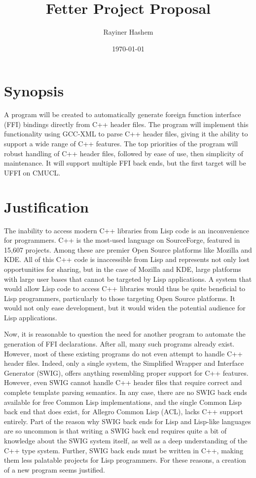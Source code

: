 \documentclass[12pt]{article}
\begin{document}
\title{Fetter Project Proposal}
\author{Rayiner Hashem}
\date{\today}
\maketitle

\section{Synopsis}

A program will be created to automatically generate foreign function
interface (FFI) bindings directly from C++ header files. The program
will implement this functionality using GCC-XML to parse C++ header
files, giving it the ability to support a wide range of C++ features.
The top priorities of the program will robust handling of C++ header
files, followed by ease of use, then simplicity of maintenance. It
will support multiple FFI back ends, but the first target will be UFFI
on CMUCL.

\section{Justification}

The inability to access modern C++ libraries from Lisp code is an
inconvenience for programmers. C++ is the most-used language on
SourceForge, featured in 15,607 projects. Among these are premier Open
Source platforms like Mozilla and KDE. All of this C++ code is
inaccessible from Lisp and represents not only lost opportunities for
sharing, but in the case of Mozilla and KDE, large platforms with
large user bases that cannot be targeted by Lisp applications. A
system that would allow Lisp code to access C++ libraries would thus
be quite beneficial to Lisp programmers, particularly to those
targeting Open Source platforms. It would not only ease development,
but it would widen the potential audience for Lisp applications.

Now, it is reasonable to question the need for another program to
automate the generation of FFI declarations. After all, many such
programs already exist. However, most of these existing programs do
not even attempt to handle C++ header files. Indeed, only a single
system, the Simplified Wrapper and Interface Generator (SWIG), offers
anything resembling proper support for C++ features. However, even
SWIG cannot handle C++ header files that require correct and complete
template parsing semantics. In any case, there are no SWIG back ends
available for free Common Lisp implementations, and the single Common
Lisp back end that does exist, for Allegro Common Lisp (ACL), lacks
C++ support entirely. Part of the reason why SWIG back ends for Lisp
and Lisp-like languages are so uncommon is that writing a SWIG back
end requires quite a bit of knowledge about the SWIG system itself, as
well as a deep understanding of the C++ type system. Further, SWIG
back ends must be written in C++,
  making them less palatable projects for Lisp programmers. For these
reasons, a creation of a new program seems justified.
\end{document}
